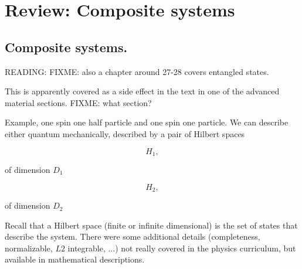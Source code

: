 %
%

\chapter{Review: Composite systems}
\label{chap:qmTwoL1}
{}
\date{Sept 12, 2011}

\beginArtWithToc

%

\section{Composite systems.}

READING: FIXME: also a chapter around 27-28 covers entangled states.

This is apparently covered as a side effect in the text \cite{desai2009quantum} in one of the advanced material sections.  FIXME: what section?

Example, one spin one half particle and one spin one particle.  We can describe either quantum mechanically, described by a pair of Hilbert spaces

\begin{equation}\label{eqn:qmTwoL1:10}
H_1,
\end{equation}

of dimension $D_1$

\begin{equation}\label{eqn:qmTwoL1:30}
H_2,
\end{equation}

of dimension $D_2$

Recall that a Hilbert space (finite or infinite dimensional) is the set of states that describe the system.  There were some additional details (completeness, normalizable, $L2$ integrable, ...) not really covered in the physics curriculum, but available in mathematical descriptions.


